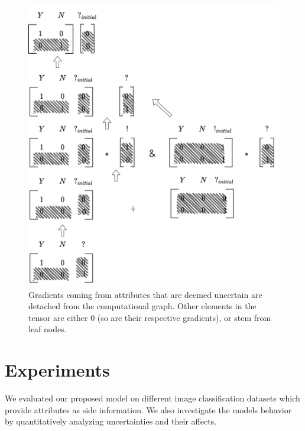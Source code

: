 \documentclass[a4paper,cleardoubleempty,BCOR1cm, 11pt]{report}
\begin{document}
\begin{figure}[t!]
\begin{minipage}{0.45\textwidth}
		\includegraphics[width=1\textwidth]{images/extended_vocab_backward.pdf}
		\caption{Gradients coming from attributes that are deemed uncertain are detached from the computational graph. Other elements in the tensor are either $0$ (so are their respective gradients), or stem from leaf nodes.}
		\label{fig:extended_vocab_backward}
	\end{minipage}
\end{figure}





\chapter{Experiments}
We evaluated our proposed model on different image classification datasets which provide attributes as side information. We also investigate the models behavior by quantitatively analyzing uncertainties and their affects.
\end{document}
